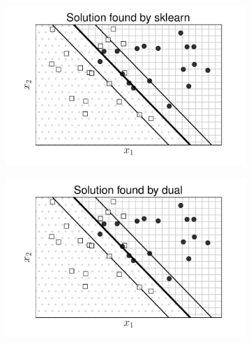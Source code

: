 \begin{figure}[t]
    \begin{subfigure}{0.325\textwidth}
    \includegraphics[width=\linewidth]{ebookML_src/src/softmargin_svm/svm_sklearn.pdf}
    \caption{}
    \end{subfigure}
    \begin{subfigure}{0.325\textwidth}
    \includegraphics[width=\linewidth]{ebookML_src/src/softmargin_svm/svm_dual.pdf}
    \caption{}
    \end{subfigure}
    \begin{subfigure}{0.325\textwidth}

\end{subfigure}
\end{figure}
